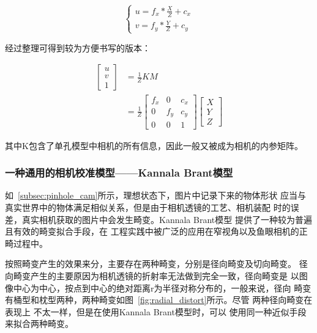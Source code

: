 \begin{equation}
  \begin{cases}
    u = f_x * \frac{X}{Z} + c_x \\
    v = f_y * \frac{Y}{Z} + c_y
  \end{cases}
\end{equation}


经过整理可得到较为方便书写的版本：

\begin{equation}
  \begin{aligned}
    \begin{bmatrix}
      u \\
      v \\
      1
    \end{bmatrix}
    &= \frac{1}{Z} K M \\
    &= \frac{1}{Z}
    \begin{bmatrix}
      f_x & 0   & c_x \\
        0 & f_y & c_y \\
        0 & 0   &   1
    \end{bmatrix}
    \begin{bmatrix}
      X \\
      Y \\
      Z
    \end{bmatrix}
  \end{aligned}
\end{equation}

其中K包含了单孔模型中相机的所有信息，因此一般又被成为相机的内参矩阵。

\subsubsection{一种通用的相机校准模型——Kannala Brant模型}

如~\ref{subsec:pinhole_cam}所示，理想状态下，图片中记录下来的物体形状
应当与真实世界中的物体满足相似关系，但是由于相机透镜的工艺、相机装配
时的误差，真实相机获取的图片中会发生畸变。Kannala Brant模型
\cite{kannala2006generic} 提供了一种较为普遍且有效的畸变拟合手段，在
工程实践中被广泛的应用在窄视角以及鱼眼相机的正畸过程中。

按照畸变产生的效果来分，主要存在两种畸变，分别是径向畸变及切向畸变。
径向畸变产生的主要原因为相机透镜的折射率无法做到完全一致，径向畸变是
以图像中心为中心，按点到中心的绝对距离r为半径对称分布的，一般来说，径向
畸变有桶型和枕型两种，两种畸变如图~\ref{fig:radial_distort}所示。尽管
两种径向畸变在表现上 不太一样，但是在使用Kannala Brant模型时，可以
使用同一种近似手段来拟合两种畸变。


